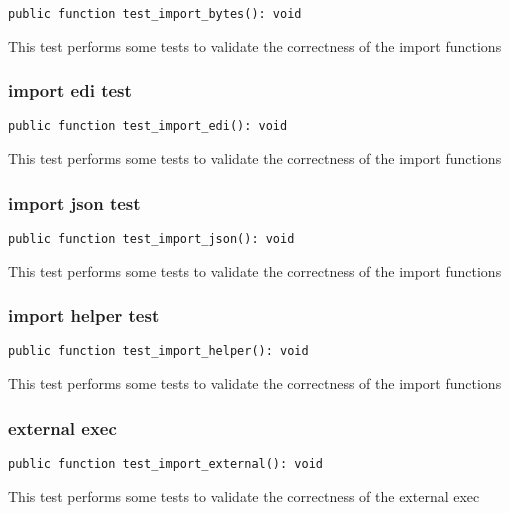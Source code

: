 \documentclass[a4paper]{article}
\begin{document}
\begin{lstlisting}
public function test_import_bytes(): void
\end{lstlisting}

This test performs some tests to validate the correctness
of the import functions

\hypertarget{toc263}{}
\subsubsection{import edi test}

\begin{lstlisting}
public function test_import_edi(): void
\end{lstlisting}

This test performs some tests to validate the correctness
of the import functions

\hypertarget{toc264}{}
\subsubsection{import json test}

\begin{lstlisting}
public function test_import_json(): void
\end{lstlisting}

This test performs some tests to validate the correctness
of the import functions

\hypertarget{toc265}{}
\subsubsection{import helper test}

\begin{lstlisting}
public function test_import_helper(): void
\end{lstlisting}

This test performs some tests to validate the correctness
of the import functions

\hypertarget{toc266}{}
\subsubsection{external exec}

\begin{lstlisting}
public function test_import_external(): void
\end{lstlisting}

This test performs some tests to validate the correctness
of the external exec
\end{document}
